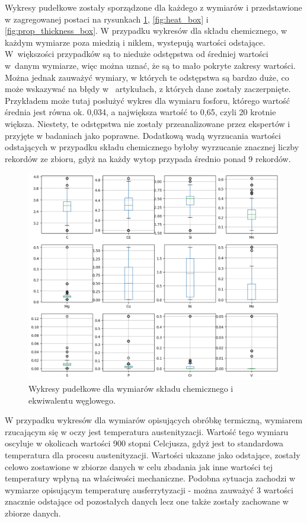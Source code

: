 Wykresy pudełkowe zostały sporządzone dla każdego z wymiarów i przedstawione w zagregowanej postaci na rysunkach \ref{fig:chem_box}, \ref{fig:heat_box} i \ref{fig:prop_thickness_box}. W przypadku wykresów dla składu chemicznego, w każdym wymiarze poza miedzią i niklem, wystepują wartości odstające. W~większości przypadków są to nieduże odstępstwa od średniej wartości w~danym wymiarze, więc można uznać, że są to mało pokryte zakresy wartości. Można jednak zauważyć wymiary, w których te odstępstwa są bardzo duże, co może wskazywać na błędy w~ artykułach, z których dane zostały zaczerpnięte. Przykładem może tutaj posłużyć wykres dla wymiaru fosforu, którego wartość średnia jest równa ok. 0,034, a największa wartość to 0,65, czyli 20 krotnie większa. Niestety, te odstępstwa nie zostały przeanalizowane przez ekspertów i przyjęte w badaniach jako poprawne. Dodatkową wadą wyrzucania wartości odstających w przypadku składu chemicznego byłoby wyrzucanie znacznej liczby rekordów ze zbioru, gdyż na każdy wytop przypada średnio ponad 9 rekordów.
\begin{figure}[ht]{}
	\centering
	\includegraphics[scale=0.5]{images/chem_box.png}
	\caption {
		 Wykresy pudełkowe dla wymiarów składu chemicznego i ekwiwalentu węglowego.
	}
	\label{fig:chem_box}
\end{figure}

W przypadku wykresów dla wymiarów opisujących obróbkę termiczną, wymiarem rzucającym się w oczy jest temperatura austenityzacji. Wartość tego wymiaru oscyluje w okolicach wartości 900 stopni Celcjusza, gdyż jest to standardowa temperatura dla procesu austenityzacji. Wartości ukazane jako odstające, zostały celowo zostawione w zbiorze danych w celu zbadania jak inne wartości tej temperatury wpłyną na właściwości mechaniczne. Podobna sytuacja zachodzi w wymiarze opisującym temperaturę ausferrytyzacji - można zauważyć 3 wartości znacznie odstające od pozostałych danych lecz one także zostały zachowane w zbiorze danych.

